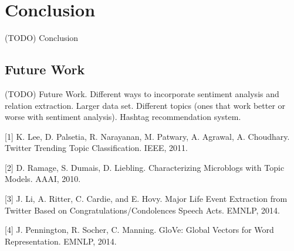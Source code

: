 \documentclass[11pt]{article}
\begin{document}
\section{Conclusion}

(TODO) Conclusion

\subsection{Future Work}

(TODO) Future Work. Different ways to incorporate sentiment analysis and relation extraction. Larger data set. Different topics (ones that work better or worse with sentiment analysis). Hashtag recommendation system.

%
%

\begin{thebibliography}{1}

 [1] K. Lee, D. Palsetia, R. Narayanan, M. Patwary, A. Agrawal, A. Choudhary. Twitter Trending Topic Classification. IEEE, 2011.

 [2] D. Ramage, S. Dumais, D. Liebling. Characterizing Microblogs with Topic Models. AAAI, 2010.

 [3] J. Li, A. Ritter, C. Cardie, and E. Hovy. Major Life Event Extraction from Twitter Based on Congratulations/Condolences Speech Acts. EMNLP, 2014.

 [4] J. Pennington, R. Socher, C. Manning. GloVe: Global Vectors for Word Representation. EMNLP, 2014.

\end{thebibliography}
\end{document}
